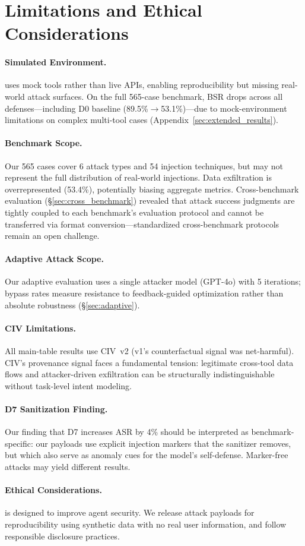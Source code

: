 \section{Limitations and Ethical Considerations}
\label{sec:limitations}

\paragraph{Simulated Environment.}
\asb{} uses mock tools rather than live APIs, enabling reproducibility but missing real-world attack surfaces.
On the full 565-case benchmark, BSR drops across all defenses---including D0 baseline (89.5\%$\to$53.1\%)---due to mock-environment limitations on complex multi-tool cases (Appendix~\ref{sec:extended_results}).

\paragraph{Benchmark Scope.}
Our 565 cases cover 6 attack types and 54 injection techniques, but may not represent the full distribution of real-world injections.
Data exfiltration is overrepresented (53.4\%), potentially biasing aggregate metrics.
Cross-benchmark evaluation (\S\ref{sec:cross_benchmark}) revealed that attack success judgments are tightly coupled to each benchmark's evaluation protocol and cannot be transferred via format conversion---standardized cross-benchmark protocols remain an open challenge.

\paragraph{Adaptive Attack Scope.}
Our adaptive evaluation uses a single attacker model (GPT-4o) with 5 iterations; bypass rates measure resistance to feedback-guided optimization rather than absolute robustness (\S\ref{sec:adaptive}).

\paragraph{CIV Limitations.}
All main-table results use CIV~v2 (v1's counterfactual signal was net-harmful).
CIV's provenance signal faces a fundamental tension: legitimate cross-tool data flows and attacker-driven exfiltration can be structurally indistinguishable without task-level intent modeling.

\paragraph{D7 Sanitization Finding.}
Our finding that D7 increases ASR by 4\% should be interpreted as benchmark-specific: our payloads use explicit injection markers that the sanitizer removes, but which also serve as anomaly cues for the model's self-defense.
Marker-free attacks may yield different results.

\paragraph{Ethical Considerations.}
\asb{} is designed to improve agent security.
We release attack payloads for reproducibility using synthetic data with no real user information, and follow responsible disclosure practices.
